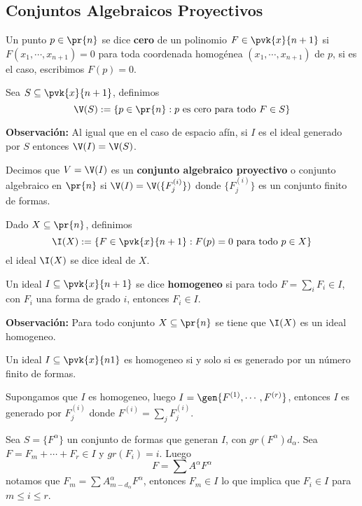 \documentclass{article}
\begin{document}
\subsection{Conjuntos Algebraicos Proyectivos}
\begin{dfn}
    Un punto $p\in\pr{n}$ se dice \textbf{cero} de un polinomio $F\in\pvk{x}{n+1}$ si 
    $F(x_{1},\cdots,x_{n+1})=0$ para toda coordenada homogénea $(x_{1},\cdots,x_{n+1})$ de $p$,
    si es el caso, escribimos $F(p)=0$.
\end{dfn}
\begin{dfn}
    Sea $S\subseteq\pvk{x}{n+1}$, definimos
    \begin{equation*}
        \V(S):=\{p\in\pr{n}:p\text{ es cero para todo }F\in S\}
    \end{equation*}
\end{dfn}
\noindent\textbf{Observación:} Al igual que en el caso de espacio afín, si $I$ es el ideal generado
por $S$ entonces $\V(I)=\V(S)$.
\begin{dfn}
    Decimos que $V=\V(I)$ es un \textbf{conjunto algebraico proyectivo} o conjunto algebraico en 
    $\pr{n}$ si $\V(I)=\V(\{F_{j}^{(i)}\})$ donde $\{F_{j}^{(i)}\}$ es un conjunto finito de 
    formas.
\end{dfn}
\begin{dfn}
    Dado $X\subseteq\pr{n}$, definimos
    \begin{equation*}
        \I(X):=\{F\in\pvk{x}{n+1}:F(p)=0\text{ para todo }p\in X\}
    \end{equation*}
    el ideal $\I(X)$ se dice ideal de $X$.
\end{dfn}
\begin{dfn}
    Un ideal $I\subseteq\pvk{x}{n+1}$ se dice \textbf{homogeneo} si para todo 
    $F=\sum_{i}F_{i}\in I$, con $F_{i}$ una forma de grado $i$, entonces $F_{i}\in I$.
\end{dfn}
\noindent\textbf{Observación:} Para todo conjunto $X\subseteq\pr{n}$ se tiene que $\I(X)$ es un
ideal homogeneo.
\begin{prop}
    Un ideal $I\subseteq\pvk{x}{n1}$ es homogeneo si y solo si es generado por un número finito de
    formas.
\end{prop}
\begin{dem}
    Supongamos que $I$ es homogeneo, luego $I=\gen{F^{(1)},\cdots,F^{(r)}}$, entonces $I$ es 
    generado por $F^{(i)}_{j}$ donde $F^{(i)}=\sum_{j}F^{(i)}_{j}$.
    
    \vspace{4mm}
    \noindent Sea $S=\{F^{\alpha}\}$ un conjunto de formas que generan $I$, con 
    $gr(F^{\alpha})d_{\alpha}$. Sea $F=F_{m}+\cdots+F_{r}\in I$ y $gr(F_{i})=i$. Luego
    \begin{equation*}
        F=\sum A^{\alpha}F^{\alpha}
    \end{equation*}
    notamos que $F_{m}=\sum A^{\alpha}_{m-d_{\alpha}}F^{\alpha}$, entonces $F_{m}\in I$ lo que 
    implica que $F_{i}\in I$ para $m\leq i\leq r$.
\end{dem}
\end{document}
